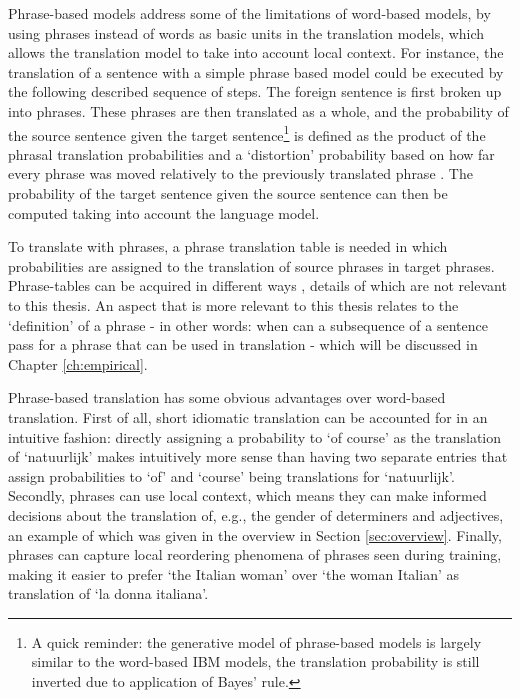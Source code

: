Phrase-based models address some of the limitations of word-based models, by using phrases instead of words as basic units in the translation models, which allows the translation model to take into account local context. For instance, the translation of a sentence with a simple phrase based model could be executed by the following described sequence of steps. The foreign sentence is first broken up into phrases. These phrases are then translated as a whole, and the probability of the source sentence given the target sentence\footnote{A quick reminder: the generative model of phrase-based models is largely similar to the word-based IBM models, the translation probability is still inverted due to application of Bayes' rule.} is defined as the product of the phrasal translation probabilities and a `distortion' probability based on how far every phrase was moved relatively to the previously translated phrase \citep{koehn2003statistical}. The probability of the target sentence given the source sentence can then be computed taking into account the language model.

To translate with phrases, a phrase translation table is needed in which probabilities are assigned to the translation of source phrases in target phrases. Phrase-tables can be acquired in different ways \citep{marcu2002phrase,och1999improved,koehn2003statistical,mylonakis_simaan_emnlp_2008}, details of which are not relevant to this thesis. An aspect that is more relevant to this thesis relates to the `definition' of a phrase -  in other words: when can a subsequence of a sentence pass for a phrase that can be used in translation - which will be discussed in Chapter \ref{ch:empirical}.

Phrase-based translation has some obvious advantages over word-based translation. First of all, short idiomatic translation can be accounted for in an intuitive fashion: directly assigning a probability to `of course' as the translation of `natuurlijk' makes intuitively more sense than having two separate entries that assign probabilities to `of' and `course' being translations for `natuurlijk'. Secondly, phrases can use local context, which means they can make informed decisions about the translation of, e.g., the gender of determiners and adjectives, an example of which was given in the overview in Section \ref{sec:overview}. Finally, phrases can capture local reordering phenomena of phrases seen during training, making it easier to prefer `the Italian woman' over `the woman Italian' as translation of `la donna italiana'.

